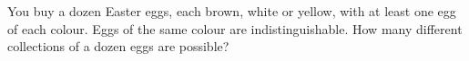 You buy a dozen Easter eggs, each brown, white or yellow, with at least one egg of each colour. Eggs of the same colour are indistinguishable. How many different collections of a dozen eggs are possible?
